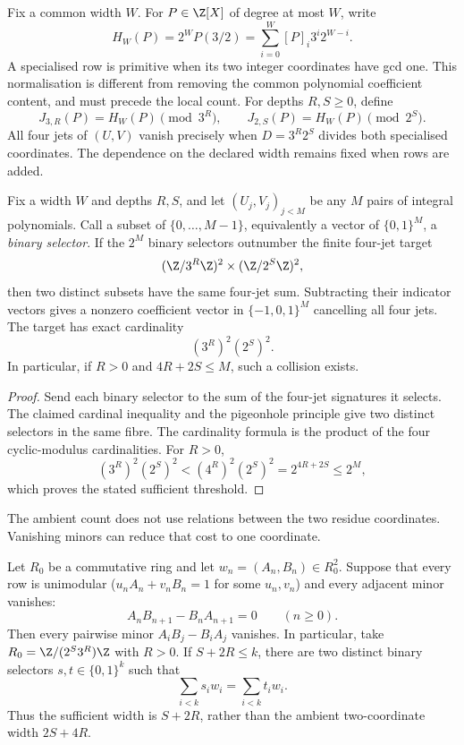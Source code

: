 \documentclass[11pt]{article}
\begin{document}
Fix a common width $W$.  For $P\in\Z[X]$ of degree at most $W$, write
\[
 H_W(P)=2^WP(3/2)=\sum_{i=0}^W[P]_i3^i2^{W-i}.
\]
A specialised row is primitive when its two integer coordinates have gcd
one.  This normalisation is different from removing the common polynomial
coefficient content, and must precede the local count.
For depths $R,S\ge0$, define
\[
 J_{3,R}(P)=H_W(P)\pmod{3^R},\qquad
 J_{2,S}(P)=H_W(P)\pmod{2^S}.
\]
All four jets of $(U,V)$ vanish precisely when $D=3^R2^S$ divides both
specialised coordinates.  The dependence on the declared width remains fixed
when rows are added.

\begin{theorem}\label{res:jetkernel}
Fix a width \(W\) and depths \(R,S\), and let \((U_j,V_j)_{j<M}\) be any \(M\)
pairs of integral polynomials.  Call a subset of \(\{0,\dots,M-1\}\), equivalently
a vector of \(\{0,1\}^M\), a \emph{binary selector}.  If the
\(2^M\) binary selectors outnumber the finite four-jet target
\[
 (\Z/3^R\Z)^2\times(\Z/2^S\Z)^2,
\]
then two distinct subsets have the same four-jet sum.  Subtracting their
indicator vectors gives a nonzero coefficient vector in
\(\{-1,0,1\}^M\) cancelling all four jets.  The target has exact cardinality
\[
 (3^R)^2(2^S)^2.
\]
In particular, if \(R>0\) and \(4R+2S\le M\), such a collision exists.
\end{theorem}

\begin{proof}
Send each binary selector to the sum of the four-jet signatures it selects.
The claimed cardinal inequality and the pigeonhole principle give two
distinct selectors in the same fibre.  The cardinality formula is the product
of the four cyclic-modulus cardinalities.  For \(R>0\),
\[
 (3^R)^2(2^S)^2<(4^R)^2(2^S)^2=2^{4R+2S}\le2^M,
\]
which proves the stated sufficient threshold.
\end{proof}

The ambient count does not use relations between the two residue
coordinates.  Vanishing minors can reduce that cost to one coordinate.

\begin{theorem}
\label{res:plucker-collapse}
Let $R_0$ be a commutative ring and let $w_n=(A_n,B_n)\in R_0^2$.  Suppose
that every row is unimodular ($u_n A_n+v_n B_n=1$ for some $u_n,v_n$) and every adjacent minor vanishes:
\[
 A_nB_{n+1}-B_nA_{n+1}=0\qquad(n\ge0).
\]
Then every pairwise minor $A_iB_j-B_iA_j$ vanishes.  In particular, take
$R_0=\Z/(2^S3^R)\Z$ with $R>0$.  If $S+2R\le k$, there are two distinct
binary selectors $s,t\in\{0,1\}^{k}$ such that
\[
 \sum_{i<k}s_iw_i=\sum_{i<k}t_iw_i.
\]
Thus the sufficient width is $S+2R$, rather than the ambient two-coordinate
width $2S+4R$.
\end{theorem}
\end{document}

